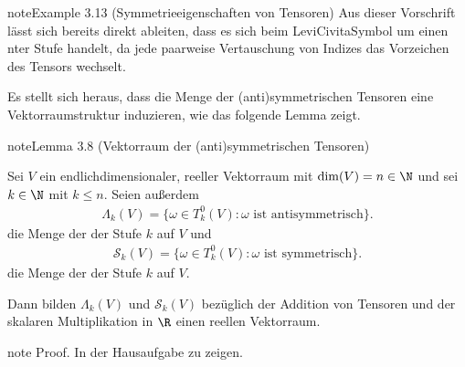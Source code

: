 \documentclass[letterpaper,10pt,german]{jupyterBook}
\begin{document}
\begin{sphinxadmonition}{note}{Example 3.13 (Symmetrieeigenschaften von Tensoren)}
\sphinxAtStartPar
Aus dieser Vorschrift lässt sich bereits direkt ableiten, dass es sich beim Levi\sphinxhyphen{}Civita\sphinxhyphen{}Symbol um einen  n\sphinxhyphen{}ter Stufe handelt, da jede paarweise Vertauschung von Indizes das Vorzeichen des Tensors wechselt.
\end{sphinxadmonition}

\sphinxAtStartPar
Es stellt sich heraus, dass die Menge der (anti\sphinxhyphen{})symmetrischen Tensoren eine Vektorraumstruktur induzieren, wie das folgende Lemma zeigt.
\label{vektoranalysis/tensor:lemma-30}
\begin{sphinxadmonition}{note}{Lemma 3.8 (Vektorraum der (anti\sphinxhyphen{})symmetrischen Tensoren)}



\sphinxAtStartPar
Sei \(V\) ein endlich\sphinxhyphen{}dimensionaler, reeller Vektorraum mit \(\operatorname{dim}(V) = n \in \N\) und sei \(k \in \N\) mit \(k \leq n\).
Seien außerdem
\begin{equation*}
\begin{split}\Lambda_k(V) = \lbrace \omega \in T_k^0(V) : \omega \text{ ist antisymmetrisch} \rbrace.\end{split}
\end{equation*}
\sphinxAtStartPar
die Menge der  der Stufe \(k\) auf \(V\) und
\begin{equation*}
\begin{split}\mathcal{S}_k(V) = \lbrace \omega \in T_k^0(V) : \omega \text{ ist symmetrisch} \rbrace.\end{split}
\end{equation*}
\sphinxAtStartPar
die Menge der  der Stufe \(k\) auf \(V\).

\sphinxAtStartPar
Dann bilden \(\Lambda_k(V)\) und \(\mathcal{S}_k(V)\) bezüglich der Addition von Tensoren und der skalaren Multiplikation in \(\R\) einen reellen Vektorraum.
\end{sphinxadmonition}

\begin{sphinxadmonition}{note}
\sphinxAtStartPar
Proof. In der Hausaufgabe zu zeigen.
\end{sphinxadmonition}
\end{document}
